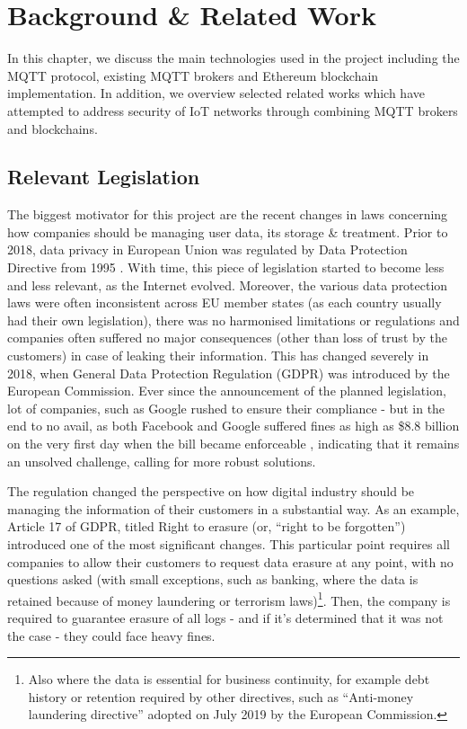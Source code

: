 \chapter{Background \& Related Work}

In this chapter, we discuss the main technologies used in the project including the MQTT protocol, existing MQTT brokers and Ethereum blockchain implementation. In addition, we overview selected related works which have attempted to address security of IoT networks through combining MQTT brokers and blockchains.
\section{Relevant Legislation}
The biggest motivator for this project are the recent changes in laws concerning how companies should be managing user data, its storage \& treatment. Prior to 2018, data privacy in European Union was regulated by Data Protection Directive from 1995 \cite{directive199595}. With time, this piece of legislation started to become less and less relevant, as the Internet evolved. Moreover, the various data protection laws were often inconsistent across EU member states (as each country usually had their own legislation), there was no harmonised limitations or regulations and companies often suffered no major consequences (other than loss of trust by the customers) in case of leaking their information. This has changed severely in 2018, when General Data Protection Regulation (GDPR) \cite{EUdataregulations2018} was introduced by the European Commission. Ever since the announcement of the planned legislation, lot of companies, such as Google rushed to ensure their compliance - but in the end to no avail, as both Facebook and Google suffered fines as high as \$8.8 billion on the very first day when the bill became enforceable \citep{brandom2018facebook}, indicating that it remains an unsolved challenge, calling for more robust solutions.

The regulation changed the perspective on how digital industry should be managing the information of their customers in a substantial way. As an example, Article 17 of GDPR, titled Right to erasure (or, ``right to be forgotten'') introduced one of the most significant changes. This particular point requires all companies to allow their customers to request data erasure at any point, with no questions asked (with small exceptions, such as banking, where the data is retained because of money laundering or terrorism laws)\footnote{Also where the data is essential for business continuity, for example debt history or retention required by other directives, such as ``Anti-money laundering directive'' adopted on July 2019 by the European Commission.}. Then, the company is required to guarantee erasure of all logs - and if it's determined that it was not the case - they could face heavy fines.

